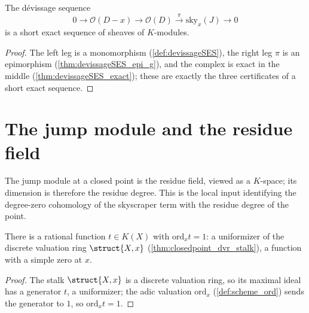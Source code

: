 \begin{theorem}
  \label{thm:devissageSES_shortExact}
  \leanok
  The dévissage sequence
  \[
    0 \longrightarrow \mathcal O(D-x) \longrightarrow \mathcal O(D)
      \xrightarrow{\ \pi\ } \mathrm{sky}_x(J) \longrightarrow 0
  \]
  is a short exact sequence of sheaves of \(K\)-modules.
\end{theorem}
\begin{proof}
  \leanok
  The left leg is a monomorphism (\ref{def:devissageSES}), the right leg \(\pi\) is an epimorphism
  (\ref{thm:devissageSES_epi_g}), and the complex is exact in the middle
  (\ref{thm:devissageSES_exact}); these are exactly the three certificates of a short exact
  sequence.
\end{proof}

\section{The jump module and the residue field}

The jump module at a closed point is the residue field, viewed as a \(K\)-space; its dimension is
therefore the residue degree. This is the local input identifying the degree-zero cohomology of the
skyscraper term with the residue degree of the point.

\begin{lemma}
  \label{lem:uniformizer}
  \leanok
  There is a rational function \(t \in K(X)\) with \(\mathrm{ord}_x t = 1\): a uniformizer of the
  discrete valuation ring \(\struct{X,x}\) (\ref{thm:closedpoint_dvr_stalk}), a function with a
  simple zero at \(x\).
\end{lemma}
\begin{proof}
  \leanok
  The stalk \(\struct{X,x}\) is a discrete valuation ring, so its maximal ideal has a generator
  \(t\), a uniformizer; the adic valuation \(\mathrm{ord}_x\) (\ref{def:scheme_ord}) sends the
  generator to \(1\), so \(\mathrm{ord}_x t = 1\).
\end{proof}

